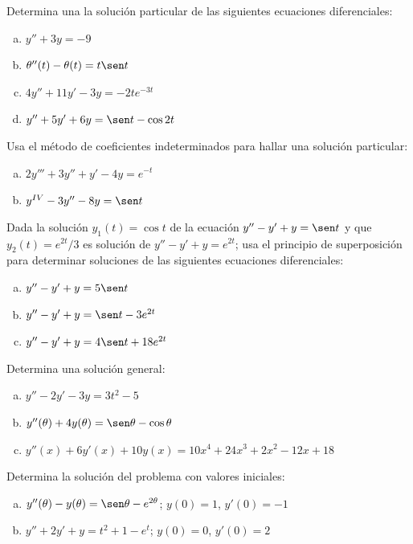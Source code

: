 \documentclass[12pt]{exam}
\begin{document}
    
    \begin{questions}
     \question%
     Determina una la solución particular de las siguientes ecuaciones diferenciales:
     \begin{enumerate}[a)]
         \item $y''+3y=-9$
         \item $\theta''(t)-\theta(t)=t\sen t$
         \item $4y''+11y'-3y=-2te^{-3t}$
         \item $y''+5y'+6y=\sen t-\cos 2t$
     \end{enumerate}


     \question%
     Usa el método de coeficientes indeterminados para hallar una solución particular:
     \begin{enumerate}[a)]
     	\item	$2y'''+3y''+y'-4y=e^{-t}$
        \item	$y^{IV}-3y''-8y=\sen t$
     \end{enumerate}

     
     \question%
     Dada la solución $y_1(t)=\cos t$ de la ecuación $y''-y'+y=\sen t$ y que $y_2(t)=e^{2t}/3$ es solución de $y''-y'+y=e^{2t}$; usa el principio de superposición para determinar soluciones de las siguientes ecuaciones diferenciales:
     \begin{enumerate}[a)]
     	\item	$y''-y'+y=5\sen t$
        \item	$y''-y'+y= \sen t-3e^{2t}$
        \item	$y''-y'+y=4\sen t+18e^{2t}$
     \end{enumerate}


     \question%
     Determina una solución general:
     \begin{enumerate}[a)]
     	\item	$y''-2y'-3y=3t^2-5$
        \item	$y''(\theta)+4y(\theta)=\sen\theta-\cos\theta$
        \item	$y''(x)+6y'(x)+10y(x)=10x^4+24x^3+2x^2-12x+18$
     \end{enumerate}



     \question%
     Determina la solución del problema con valores iniciales:
     \begin{enumerate}[a)]
        \item	$y''(\theta)-y(\theta)=\sen\theta-e^{2\theta}$;  $y(0)=1$,  $y'(0)=-1$
        \item	$y''+2y'+y=t^2+1-e^t$;  $y(0)=0$,  $y'(0)=2$
     \end{enumerate}




\end{questions}
\end{document}

